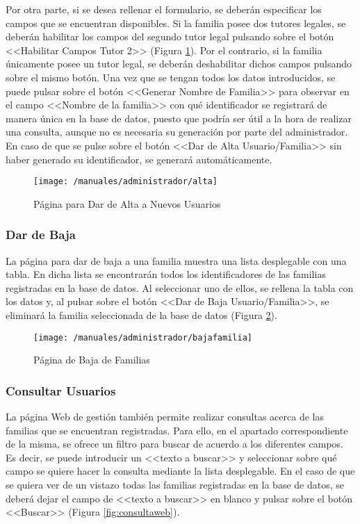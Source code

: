 Por otra parte, si se desea rellenar el formulario, se deberán especificar los campos que se encuentran disponibles. Si la familia posee dos tutores legales, se deberán habilitar los campos del segundo tutor legal pulsando sobre el botón <<Habilitar Campos Tutor 2>> (Figura \ref{fig:altaweb}). Por el contrario, si la familia únicamente posee un tutor legal, se deberán deshabilitar dichos campos pulsando sobre el mismo botón. Una vez que se tengan todos los datos introducidos, se puede pulsar sobre el botón <<Generar Nombre de Familia>> para observar en el campo <<Nombre de la familia>> con qué identificador se registrará de manera única en la base de datos, puesto que podría ser útil a la hora de realizar una consulta, aunque no es necesaria su generación por parte del administrador. En caso de que se pulse sobre el botón <<Dar de Alta Usuario/Familia>> sin haber generado su identificador, se generará automáticamente.

\begin{figure}[!h]
	\begin{center}
		\texttt{[image: /manuales/administrador/alta]}
		\caption{Página para Dar de Alta a Nuevos Usuarios}
		\label{fig:altaweb}
	\end{center}
\end{figure}

\clearpage

\subsubsection*{Dar de Baja}
La página para dar de baja a una familia muestra una lista desplegable con una tabla. En dicha lista se encontrarán todos los identificadores de las familias registradas en la base de datos. Al seleccionar uno de ellos, se rellena la tabla con los datos y, al pulsar sobre el botón <<Dar de Baja Usuario/Familia>>, se eliminará la familia seleccionada de la base de datos (Figura \ref{fig:bajaweb}).

\begin{figure}[!h]
	\begin{center}
		\texttt{[image: /manuales/administrador/bajafamilia]}
		\caption{Página de Baja de Familias}
		\label{fig:bajaweb}
	\end{center}
\end{figure}

\subsubsection*{Consultar Usuarios}
La página Web de gestión también permite realizar consultas acerca de las familias que se encuentran registradas. Para ello, en el apartado correspondiente de la misma, se ofrece un filtro para buscar de acuerdo a los diferentes campos. Es decir, se puede introducir un <<texto a buscar>> y seleccionar sobre qué campo se quiere hacer la consulta mediante la lista desplegable. En el caso de que se quiera ver de un vistazo todas las familias registradas en la base de datos, se deberá dejar el campo de <<texto a buscar>> en blanco y pulsar sobre el botón <<Buscar>> (Figura \ref{fig:consultaweb}).

